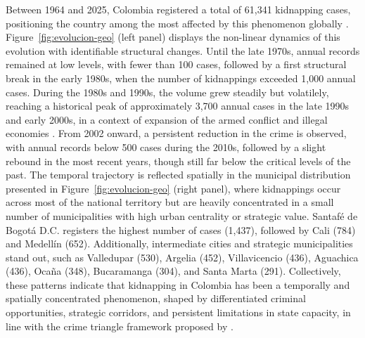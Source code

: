 \documentclass[ecta,nameyear,draft]{econsocart}
\theoremstyle{plain}
\theoremstyle{definition}
\newcommand{\1}{\mathbf{1}}
\begin{document}
Between 1964 and 2025, Colombia registered a total of 61,341 kidnapping cases, positioning the country among the most affected by this phenomenon globally \citet{cnmh_datos}. Figure~\ref{fig:evolucion-geo} (left panel) displays the non-linear dynamics of this evolution with identifiable structural changes. Until the late 1970s, annual records remained at low levels, with fewer than 100 cases, followed by a first structural break in the early 1980s, when the number of kidnappings exceeded 1,000 annual cases. During the 1980s and 1990s, the volume grew steadily but volatilely, reaching a historical peak of approximately 3,700 annual cases in the late 1990s and early 2000s, in a context of expansion of the armed conflict and illegal economies \citet{pinto2004}. From 2002 onward, a persistent reduction in the crime is observed, with annual records below 500 cases during the 2010s, followed by a slight rebound in the most recent years, though still far below the critical levels of the past.
The temporal trajectory is reflected spatially in the municipal distribution presented in Figure~\ref{fig:evolucion-geo} (right panel), where kidnappings occur across most of the national territory but are heavily concentrated in a small number of municipalities with high urban centrality or strategic value. Santafé de Bogotá D.C. registers the highest number of cases (1,437), followed by Cali (784) and Medellín (652). Additionally, intermediate cities and strategic municipalities stand out, such as Valledupar (530), Argelia (452), Villavicencio (436), Aguachica (436), Ocaña (348), Bucaramanga (304), and Santa Marta (291). Collectively, these patterns indicate that kidnapping in Colombia has been a temporally and spatially concentrated phenomenon, shaped by differentiated criminal opportunities, strategic corridors, and persistent limitations in state capacity, in line with the crime triangle framework proposed by \citet{Pires2014}.
\end{document}
